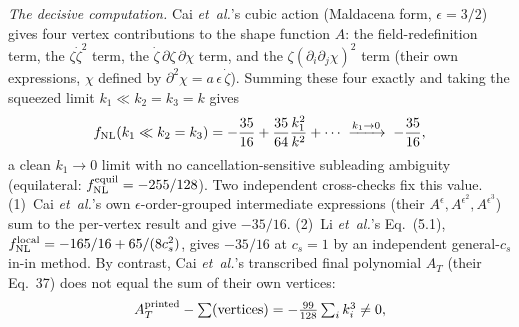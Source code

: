 \documentclass[aps,prd,twocolumn,superscriptaddress,showpacs,preprintnumbers,nofootinbib,longbibliography,floatfix]{revtex4-2}
\newcommand{\fnl}{f_{\rm NL}}
\newcommand{\etal}{\textit{et~al.}}
\begin{document}
\emph{The decisive computation.} Cai \etal's cubic action (Maldacena form, $\epsilon=3/2$) gives four vertex contributions to the shape function $A$: the field-redefinition term, the $\zeta\dot\zeta^2$ term, the $\dot\zeta\,\partial\zeta\,\partial\chi$ term, and the $\zeta(\partial_i\partial_j\chi)^2$ term (their own expressions, $\chi$ defined by $\partial^2\chi = a\,\epsilon\,\dot\zeta$). Summing these four exactly and taking the squeezed limit $k_1\ll k_2=k_3=k$ gives
\begin{equation}
\fnl(k_1\ll k_2=k_3) = -\frac{35}{16} + \frac{35}{64}\frac{k_1^2}{k^2} + \cdots \;\xrightarrow{k_1\to 0}\; -\frac{35}{16},
\label{eq:decisive_sqz}
\end{equation}
a clean $k_1\to0$ limit with no cancellation-sensitive subleading ambiguity (equilateral: $\fnl^{\rm equil}=-255/128$). Two independent cross-checks fix this value. (1)~Cai \etal's own $\epsilon$-order-grouped intermediate expressions (their $A^\epsilon,A^{\epsilon^2},A^{\epsilon^3}$) sum to the per-vertex result and give $-35/16$. (2)~Li \etal's Eq.~(5.1), $\fnl^{\rm local}=-165/16+65/(8c_s^2)$, gives $-35/16$ at $c_s=1$ by an independent general-$c_s$ in-in method. By contrast, Cai \etal's transcribed final polynomial $A_T$ (their Eq.~37) does not equal the sum of their own vertices:
\begin{equation}
A_T^{\rm printed} - \textstyle\sum(\text{vertices}) = -\frac{99}{128}\sum_i k_i^3 \neq 0,
\label{eq:spurious}
\end{equation}
\end{document}
